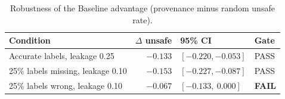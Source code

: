 \begin{table}[t]
\centering
\caption{Robustness of the Baseline advantage (provenance minus random unsafe rate).}
\label{tab:robust}
\begin{tabular}{lrll}
\toprule
Condition & $\Delta$ unsafe & 95\% CI & Gate \\
\midrule
Accurate labels, leakage 0.25 & $-0.133$ & $[-0.220,-0.053]$ & PASS \\
25\% labels missing, leakage 0.10 & $-0.153$ & $[-0.227,-0.087]$ & PASS \\
25\% labels wrong, leakage 0.10 & $-0.067$ & $[-0.133,\ 0.000]$ & \textbf{FAIL} \\
\bottomrule
\end{tabular}
\end{table}
